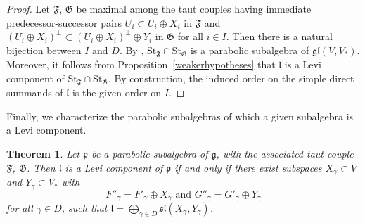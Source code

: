 \documentclass{amsart}
\newtheorem{theorem}{Theorem}[section]
\theoremstyle{definition}
\theoremstyle{remark}
\numberwithin{equation}{section}
\newcommand {\St} {\mathrm{St}}
\def\gl{\mathfrak {gl}}
\def\g{\mathfrak {g}}
\def\l{\mathfrak {l}}
\def\p{\mathfrak {p}}
\def\sl{\mathfrak{sl}}
\def\F{\mathfrak{F}}
\def\G{\mathfrak{G}}
\begin{document}
\begin{proof}
Let $\F$, $\G$ be maximal among the taut couples having immediate predecessor-successor pairs $U_i \subset U_i \oplus X_i$ in $\F$ and $(U_i \oplus X_i)^\perp \subset (U_i \oplus X_i)^\perp \oplus Y_i$ in $\G$ for all $i \in I$.  Then there is a natural bijection between $I$ and $D$.  By \cite[Theorem 5.6]{DP}, $\St_\F \cap \St_\G$ is a parabolic subalgebra of $\gl(V,V_*)$.  Moreover, it follows from Proposition~\ref{weakerhypotheses} that $\l$ is a Levi component of $\St_\F \cap \St_\G$.  By construction, the induced order on the simple direct summands of $\l$ is the given order on $I$.
\end{proof}


Finally, we characterize the parabolic subalgebras of which a given subalgebra is a Levi component.


\begin{theorem} \label{iffgl}
Let $\p$ be a parabolic subalgebra of $\g$, with the associated taut couple $\F$, $\G$.  Then $\l$ is a Levi component of $\p$ if and only if
there exist subspaces $X_\gamma \subset V$ and $Y_\gamma \subset V_*$ with 
\begin{equation} \label{comps}
F''_\gamma = F'_\gamma \oplus X_\gamma  \textrm{ and }  G''_\gamma = G'_\gamma \oplus Y_\gamma
\end{equation}
for all $\gamma \in D$, such that 
$\l = \bigoplus_{\gamma \in D} \sl(X_\gamma, Y_\gamma)$.
\end{theorem}
\end{document}
